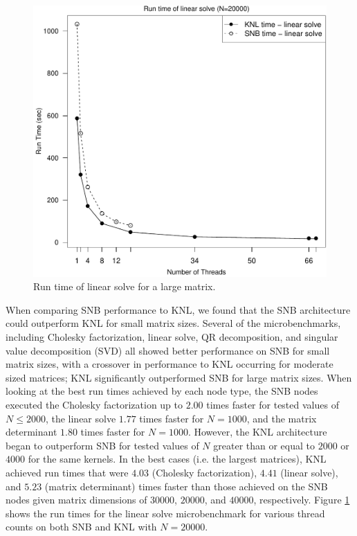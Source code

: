 \begin{figure}
\includegraphics[height=\columnwidth, width=\columnwidth]{linsolve_20000_68-rt.pdf}
\caption{Run time of linear solve for a large matrix.}
\label{fig:largeLinsolveTime}
\end{figure}

When comparing SNB performance to KNL, we found that the SNB architecture could outperform
KNL for small matrix sizes. Several of the microbenchmarks, including Cholesky
factorization, linear solve, QR decomposition, and singular value decomposition (SVD) all
showed better performance on SNB for small matrix sizes, with a crossover in performance
to KNL occurring for moderate sized matrices; KNL significantly outperformed SNB for
large matrix sizes. When looking at the best run times achieved by each node type, the SNB
nodes executed the Cholesky factorization up to $2.00$ times faster for tested values of
$N\leq 2000$, the linear solve $1.77$ times faster for $N=1000$, and the matrix determinant
$1.80$ times faster for $N=1000$.
However, the KNL architecture began to outperform SNB for tested values of $N$ greater than or
equal to $2000$ or $4000$ for the same kernels. In the best cases (i.e. the largest matrices),
KNL achieved run
times that were $4.03$ (Cholesky factorization), $4.41$ (linear solve), and $5.23$ (matrix
determinant) times faster than those achieved on the SNB nodes given matrix dimensions of
$30000$, $20000$, and $40000$, respectively. Figure \ref{fig:largeLinsolveTime} shows the
run times for the linear solve microbenchmark for various thread counts on both SNB and
KNL with $N=20000$.

